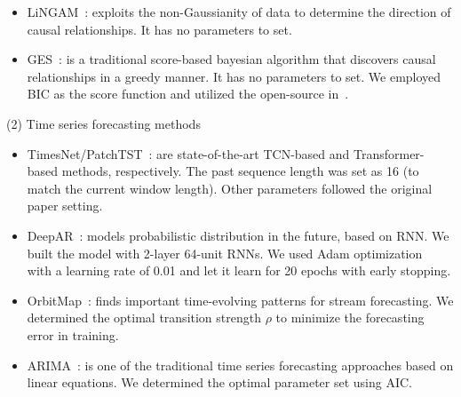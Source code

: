 {\begin{itemize}
    \item LiNGAM~\cite{shimizu2006linear}:
    exploits the non-Gaussianity of data to determine the direction of causal relationships. It has no parameters to set.
    \item GES~\cite{chickering2002optimal}: is a traditional score-based bayesian algorithm that discovers causal relationships in a greedy manner.
    It has no parameters to set.
    We employed BIC as the score function and utilized the open-source in~\cite{kalainathan2020causal}.
\end{itemize}
\vspace{-0.5ex}}
\par\noindent
(2) Time series forecasting methods
{\setlength{\leftmargini}{11pt}
\vspace{-0.3ex}
\begin{itemize}
    \item TimesNet/PatchTST~\cite{wu2023timesnet, Yuqietal-2023-PatchTST}: are state-of-the-art TCN-based and Transformer-based methods, respectively.
    The past sequence length was set as 16 (to match the current window length).
    Other parameters followed the original paper setting.
    \item DeepAR~\cite{salinas2020deepar}: models probabilistic distribution in the future, based on RNN. We built the model with 2-layer 64-unit RNNs. We used Adam optimization~\cite{adam} with a learning rate of 0.01 and let it learn for 20 epochs with early stopping.
    \item OrbitMap~\cite{matsubara2019dynamic}:
    finds important time-evolving patterns for stream forecasting.
    We determined the optimal transition strength $\rho$ to minimize the forecasting error in training.
    \item ARIMA~\cite{box1976arima}: is one of the traditional time series forecasting approaches based on linear
    equations. We determined the optimal parameter set using AIC.
\end{itemize}}
